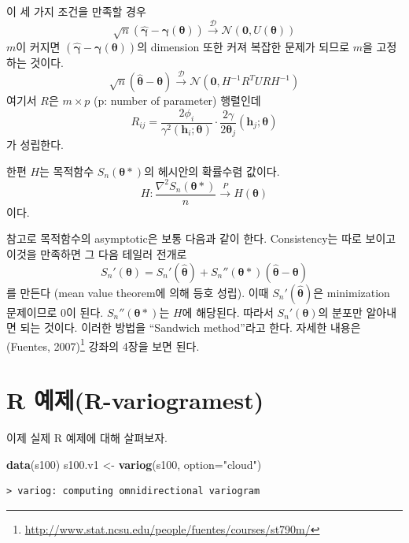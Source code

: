 \documentclass[b5paper,]{scrbook}
\makeatletter
\newenvironment{Shaded}{\begin{snugshade}}{\end{snugshade}}
\newcommand{\KeywordTok}[1]{\textcolor[rgb]{0.13,0.29,0.53}{\textbf{{#1}}}}
\newcommand{\DataTypeTok}[1]{\textcolor[rgb]{0.13,0.29,0.53}{{#1}}}
\newcommand{\StringTok}[1]{\textcolor[rgb]{0.31,0.60,0.02}{{#1}}}
\newcommand{\NormalTok}[1]{{#1}}
\theoremstyle{plain}
\theoremstyle{definition}
\numberwithin{equation}{section}
\renewcommand{\href}[2]{#2\footnote{\url{#1}}}
\newenvironment{kframe}{%
\medskip{}
\setlength{\fboxsep}{.8em}
 \def\at@end@of@kframe{}%
 \ifinner\ifhmode%
  \def\at@end@of@kframe{\end{minipage}}%
  \begin{minipage}{\columnwidth}%
 \fi\fi%
 \def\FrameCommand##1{\hskip\@totalleftmargin \hskip-\fboxsep
 \colorbox{shadecolor}{##1}\hskip-\fboxsep
     \hskip-\linewidth \hskip-\@totalleftmargin \hskip\columnwidth}%
 \MakeFramed {\advance\hsize-\width
   \@totalleftmargin\z@ \linewidth\hsize
   \@setminipage}}%
 {\par\unskip\endMakeFramed%
 \at@end@of@kframe}
\renewenvironment{Shaded}{\begin{kframe}}{\end{kframe}}
\makeatother
\begin{document}
이 세 가지 조건을 만족할 경우
\[\sqrt{n}(\hat{\boldsymbol{\gamma}}-\boldsymbol{\gamma}(\boldsymbol{\theta}))  \stackrel{\mathcal{D}}{\rightarrow} \mathcal{N}(\mathbf{0}, U(\boldsymbol{\theta}))\]
\(m\)이 커지면
\((\hat{\boldsymbol{\gamma}}-\boldsymbol{\gamma}(\boldsymbol{\theta}))\)의
dimension 또한 커져 복잡한 문제가 되므로 \(m\)을 고정하는 것이다.
\[\sqrt{n}(\hat{\boldsymbol{\theta}}-\boldsymbol{\theta})  \stackrel{\mathcal{D}}{\rightarrow} \mathcal{N}(\mathbf{0}, H^{-1}R^{T}URH^{-1})\]
여기서 \(R\)은 \(m \times p\) (p: number of parameter) 행렬인데
\[R_{ij}=\frac{2\phi_{i}}{\gamma^{2}(\mathbf{h}_{i};\boldsymbol{\theta})}\cdot \frac{2\gamma}{2\boldsymbol{\theta}_{j}}(\mathbf{h}_{j};\boldsymbol{\theta})\]
가 성립한다.

한편 \(H\)는 목적함수 \(S_{n}(\boldsymbol{\theta}*)\)의 헤시안의
확률수렴 값이다.
\[H:\frac{\nabla^{2}S_{n}(\boldsymbol{\theta}*)}{n} \stackrel{P}{\rightarrow} H(\boldsymbol{\theta})\]
이다.

참고로 목적함수의 asymptotic은 보통 다음과 같이 한다. Consistency는 따로
보이고 이것을 만족하면 그 다음 테일러 전개로
\[S_{n}'(\boldsymbol{\theta})=S_{n}'(\hat{\boldsymbol{\theta}})+S_{n}''(\boldsymbol{\theta}*)(\hat{\boldsymbol{\theta}}-\boldsymbol{\theta})\]
를 만든다 (mean value theorem에 의해 등호 성립). 이때
\(S_{n}'(\hat{\boldsymbol{\theta}})\)은 minimization 문제이므로 0이
된다. \(S_{n}''(\boldsymbol{\theta}*)\)는 \(H\)에 해당된다. 따라서
\(S_{n}'(\boldsymbol{\theta})\)의 분포만 알아내면 되는 것이다. 이러한
방법을 ``Sandwich method''라고 한다. 자세한 내용은
\href{http://www.stat.ncsu.edu/people/fuentes/courses/st790m/}{(Fuentes,
2007)} 강좌의 4장을 보면 된다.

\section{R 예제(R-variogramest)}\label{r-r-variogramest}

이제 실제 R 예제에 대해 살펴보자.

\begin{Shaded}
\begin{Highlighting}[]
\KeywordTok{data}\NormalTok{(s100)}
\NormalTok{s100.v1 <-}\StringTok{ }\KeywordTok{variog}\NormalTok{(s100, }\DataTypeTok{option=}\StringTok{"cloud"}\NormalTok{)}
\end{Highlighting}
\end{Shaded}

\begin{verbatim}
> variog: computing omnidirectional variogram
\end{verbatim}
\end{document}
